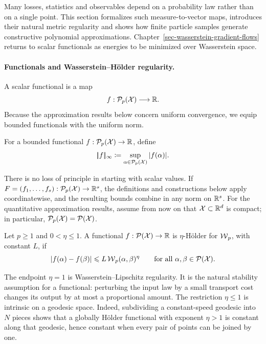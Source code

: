 Many losses, statistics and observables depend on a probability law rather than on a single point. This section formalizes such measure-to-vector maps, introduces their natural metric regularity and shows how finite particle samples generate constructive polynomial approximations. Chapter~\ref{sec-wasserstein-gradient-flows} returns to scalar functionals as energies to be minimized over Wasserstein space.

\paragraph{Functionals and Wasserstein--H\"older regularity.}

A scalar functional is a map
\[
	f:\mathcal{P}_p(\mathcal{X})\longrightarrow\mathbb{R}.
\]
Because the approximation results below concern uniform convergence, we equip bounded functionals with the uniform norm.

\begin{defn}\label{def-uniform-norm-functionals}
	For a bounded functional \(f:\mathcal{P}_p(\mathcal{X})\to\mathbb{R}\), define
	\[
		|\!| f |\!|_\infty
		\coloneqq
		\sup_{\alpha\in\mathcal{P}_p(\mathcal{X})}|f(\alpha)|.
	\]
\end{defn}

There is no loss of principle in starting with scalar values. If \(F=(f_1,\ldots,f_s):\mathcal{P}_p(\mathcal{X})\to\mathbb{R}^s\), the definitions and constructions below apply coordinatewise, and the resulting bounds combine in any norm on \(\mathbb{R}^s\). For the quantitative approximation results, assume from now on that \(\mathcal{X}\subset\mathbb{R}^d\) is compact; in particular, \(\mathcal{P}_p(\mathcal{X})=\mathcal{P}(\mathcal{X})\).

\begin{defn}\label{def-wasserstein-holder-functional}
	Let \(p\geq1\) and \(0<\eta\leq1\). A functional \(f:\mathcal{P}(\mathcal{X})\to\mathbb{R}\) is \(\eta\)-H\"older for \(\operatorname{\mathcal{W}}_p\), with constant \(L\), if
	\begin{equation}\label{eq-wasserstein-holder-functional}
		|f(\alpha)-f(\beta)|
		\leqslant
		L\operatorname{\mathcal{W}}_p(\alpha,\beta)^\eta
		\qquad
		\text{for all }\alpha,\beta\in\mathcal{P}(\mathcal{X}).
	\end{equation}
\end{defn}

The endpoint \(\eta=1\) is Wasserstein--Lipschitz regularity. It is the natural stability assumption for a functional: perturbing the input law by a small transport cost changes its output by at most a proportional amount. The restriction \(\eta\leq1\) is intrinsic on a geodesic space. Indeed, subdividing a constant-speed geodesic into \(N\) pieces shows that a globally H\"older functional with exponent \(\eta>1\) is constant along that geodesic, hence constant when every pair of points can be joined by one.

